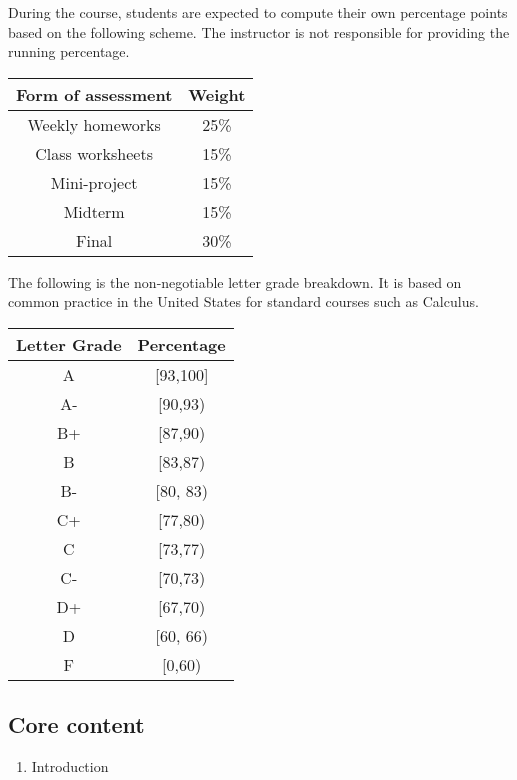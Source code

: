 \documentclass[
]{article}
\providecommand{\tightlist}{%
  \setlength{\itemsep}{0pt}\setlength{\parskip}{0pt}}
\begin{document}
During the course, students are expected to compute their own percentage
points based on the following scheme.
The instructor is not responsible for providing the running percentage.

\begin{longtable}[]{@{}cc@{}}
\toprule\noalign{}
\textbf{Form of assessment} & \textbf{Weight} \\
\midrule\noalign{}
\endhead
\bottomrule\noalign{}
\endlastfoot
Weekly homeworks & 25\% \\
Class worksheets & 15\% \\
Mini-project & 15\% \\
Midterm & 15\% \\
Final & 30\% \\
\end{longtable}

The following is the non-negotiable letter grade breakdown. It is based on
common practice in the United States for standard courses such as Calculus.

\begin{longtable}[]{@{}cc@{}}
\toprule\noalign{}
\textbf{Letter Grade} & \textbf{Percentage} \\
\midrule\noalign{}
\endhead
\bottomrule\noalign{}
\endlastfoot
A & {[}93,100{]} \\
A- & {[}90,93) \\
B+ & {[}87,90) \\
B & {[}83,87) \\
B- & {[}80, 83) \\
C+ & {[}77,80) \\
C & {[}73,77) \\
C- & {[}70,73) \\
D+ & {[}67,70) \\
D & {[}60, 66) \\
F & {[}0,60) \\
\end{longtable}

\hypertarget{core-content}{%
\subsection*{Core content}\label{core-content}}

\begin{enumerate}
\def\labelenumi{\arabic{enumi}.}
\tightlist
\item
  Introduction
\end{enumerate}
\end{document}

